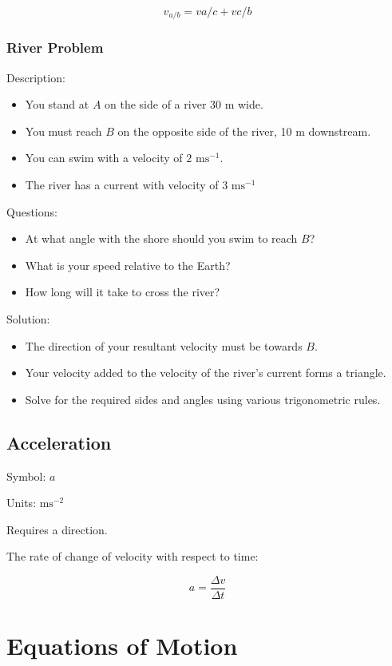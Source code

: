 \documentclass[a4paper,11pt]{article}
\begin{document}
$$
v_{a/b} = v{a/c} + v{c/b}
$$


\subsubsection{River Problem}

Description:

\begin{itemize}
\item You stand at $A$ on the side of a river 30 m wide.
\item You must reach $B$ on the opposite side of the river, 10 m downstream.
\item You can swim with a velocity of $2\mbox{ ms}^{-1}$.
\item The river has a current with velocity of $3\mbox{ ms}^{-1}$
\end{itemize}

Questions:

\begin{itemize}
\item At what angle with the shore should you swim to reach $B$?
\item What is your speed relative to the Earth?
\item How long will it take to cross the river?
\end{itemize}

Solution:

\begin{itemize}
\item The direction of your resultant velocity must be towards $B$.
\item Your velocity added to the velocity of the river's current forms a
	triangle.
\item Solve for the required sides and angles using various trigonometric rules.
\end{itemize}


\subsection{Acceleration}

Symbol: $a$

Units: $\mbox{ms}^{-2}$

Requires a direction.

The rate of change of velocity with respect to time:

$$
a = \frac{\Delta v}{\Delta t}
$$




\section{Equations of Motion}
\end{document}
